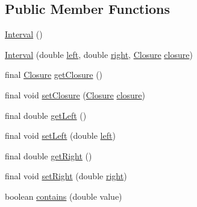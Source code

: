 \subsection*{Public Member Functions}
\begin{DoxyCompactItemize}
\item 
\hyperlink{classnet_1_1sf_1_1jclec_1_1util_1_1range_1_1_interval_a6858d09572d0ecc01e5ce1924b761782}{Interval} ()
\item 
\hyperlink{classnet_1_1sf_1_1jclec_1_1util_1_1range_1_1_interval_ad11c5b7535a94b10e6f0b45f58d4509b}{Interval} (double \hyperlink{classnet_1_1sf_1_1jclec_1_1util_1_1range_1_1_interval_aa25ee9b30f56b5a932764b8091db7f52}{left}, double \hyperlink{classnet_1_1sf_1_1jclec_1_1util_1_1range_1_1_interval_ad657e25c0176501ea3bea8f25ece6bfc}{right}, \hyperlink{enumnet_1_1sf_1_1jclec_1_1util_1_1range_1_1_closure}{Closure} \hyperlink{classnet_1_1sf_1_1jclec_1_1util_1_1range_1_1_interval_a3233c1fbd6f1dc6d660f2e147d850bf6}{closure})
\item 
final \hyperlink{enumnet_1_1sf_1_1jclec_1_1util_1_1range_1_1_closure}{Closure} \hyperlink{classnet_1_1sf_1_1jclec_1_1util_1_1range_1_1_interval_a42463eaf2ce885420a04d5b4d93b6b25}{get\-Closure} ()
\item 
final void \hyperlink{classnet_1_1sf_1_1jclec_1_1util_1_1range_1_1_interval_a1a2278e8abe6ed94b7f98da7b760b221}{set\-Closure} (\hyperlink{enumnet_1_1sf_1_1jclec_1_1util_1_1range_1_1_closure}{Closure} \hyperlink{classnet_1_1sf_1_1jclec_1_1util_1_1range_1_1_interval_a3233c1fbd6f1dc6d660f2e147d850bf6}{closure})
\item 
final double \hyperlink{classnet_1_1sf_1_1jclec_1_1util_1_1range_1_1_interval_ae9eecc05384115c110537a1bca0a041b}{get\-Left} ()
\item 
final void \hyperlink{classnet_1_1sf_1_1jclec_1_1util_1_1range_1_1_interval_a5fe0c0f896092381b95c94a07791c15c}{set\-Left} (double \hyperlink{classnet_1_1sf_1_1jclec_1_1util_1_1range_1_1_interval_aa25ee9b30f56b5a932764b8091db7f52}{left})
\item 
final double \hyperlink{classnet_1_1sf_1_1jclec_1_1util_1_1range_1_1_interval_ab9706c619f73d39575c621c67b95b4f8}{get\-Right} ()
\item 
final void \hyperlink{classnet_1_1sf_1_1jclec_1_1util_1_1range_1_1_interval_a6c74d82c5788c9bd2ddac972be7a17bc}{set\-Right} (double \hyperlink{classnet_1_1sf_1_1jclec_1_1util_1_1range_1_1_interval_ad657e25c0176501ea3bea8f25ece6bfc}{right})
\item 
boolean \hyperlink{classnet_1_1sf_1_1jclec_1_1util_1_1range_1_1_interval_a5fbcb4447ef3b221b3a4886b9c3fdacd}{contains} (double value)

\end{DoxyCompactItemize}
